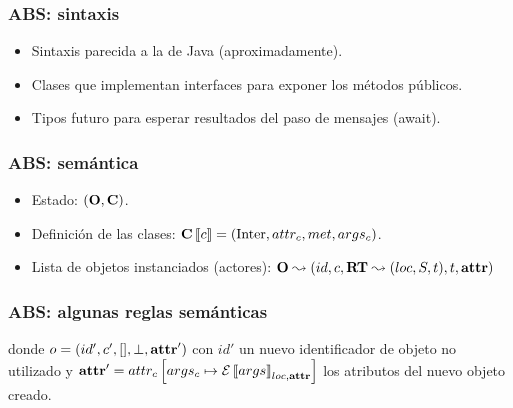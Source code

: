 \documentclass[spanish, a4paper, 12pt, final, slideColor, nototal, colorBG, pdf, noaccumulate, darkblue] {beamer}
\begin{document}
\begin{frame}[fragile]
  \frametitle{ABS: sintaxis}
  \begin{itemize}
  \item Sintaxis parecida a la de Java (aproximadamente).
  \item Clases que implementan interfaces para exponer los métodos públicos.
  \item Tipos futuro para esperar resultados del paso de mensajes (await).
  \end{itemize}
  \fontsize{7}{7.2}\selectfont
  
  
  
\end{frame}

\begin{frame}[fragile]
  \frametitle{ABS: semántica}
 \begin{itemize}
  \item Estado: $(\mathbf{O}, \mathbf{C})$.
  \item Definición de las clases: $\mathbf{C}\left\llbracket c \right\rrbracket = (\mbox{Inter}, attr_c, met, args_c)$.
  \item Lista de objetos instanciados (actores): $\mathbf{O} \leadsto (id, c, \textbf{RT} \leadsto (loc, S, t), t, \textbf{attr})$
  \end{itemize}
\end{frame}

\begin{frame}[fragile]
  \frametitle{ABS: algunas reglas semánticas}
  \fontsize{5}{7.2}\selectfont
  \begin{prooftree*}
  \end{prooftree*}

  \fontsize{4}{7.2}\selectfont
   \begin{prooftree*}
   \end{prooftree*}
\fontsize{7}{7.2}\selectfont
   donde $o = (id', c', [], \perp, \textbf{attr}')$ con $id'$ un nuevo identificador de objeto no utilizado y $\textbf{attr}' = attr_c \left[ args_c\mapsto\mathcal{E}\left\llbracket args \right\rrbracket_{loc, \textbf{attr}} \right]$ los atributos del nuevo objeto creado.
\end{frame}
\end{document}

